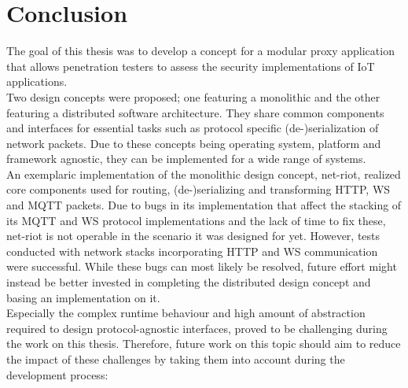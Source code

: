 \chapter{Conclusion}
\label{chap:conclusion}
The goal of this thesis was to develop a concept for a modular proxy application that allows penetration testers to assess the security implementations of \ac{IoT} applications.\\
Two design concepts were proposed; one featuring a monolithic and the other featuring a distributed software architecture. They share common components and interfaces for essential tasks such as protocol specific (de-)serialization of network packets. Due to these concepts being operating system, platform and framework agnostic, they can be implemented for a wide range of systems.\\
An exemplaric implementation of the monolithic design concept, net-riot, realized core components used for routing, (de-)serializing and transforming \ac{HTTP}, \ac{WS} and \ac{MQTT} packets. Due to bugs in its implementation that affect the stacking of its \ac{MQTT} and \ac{WS} protocol implementations and the lack of time to fix these, net-riot is not operable in the scenario it was designed for yet. However, tests conducted with network stacks incorporating \ac{HTTP} and \ac{WS} communication were successful. While these bugs can most likely be resolved, future effort might instead be better invested in completing the distributed design concept and basing an implementation on it.\\
Especially the complex runtime behaviour and high amount of abstraction required to design protocol-agnostic interfaces, proved to be challenging during the work on this thesis. Therefore, future work on this topic should aim to reduce the impact of these challenges by taking them into account during the development process:
